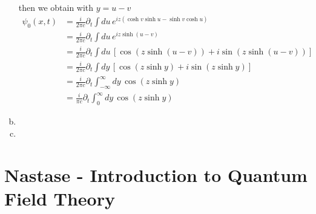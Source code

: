 \documentclass[../main.tex]{subfiles}
\begin{document}
\begin{enumerate}[(a)]
then we obtain with $y=u-v$
\begin{align}
\psi_0(x,t)
&=\frac{i}{2\pi c}\partial_t\int du\,e^{iz(\cosh v\sinh u-\sinh v\cosh u)}\\
&=\frac{i}{2\pi c}\partial_t\int du\,e^{iz\sinh (u-v)}\\
&=\frac{i}{2\pi c}\partial_t\int du\,\left[\cos(z\sinh (u-v))+i\sin(z\sinh (u-v))\right]\\
&=\frac{i}{2\pi c}\partial_t\int dy\,\left[\cos(z\sinh y)+i\sin(z\sinh y)\right]\\
&=\frac{i}{2\pi c}\partial_t\int_{-\infty}^\infty dy\,\cos(z\sinh y)\\
&=\frac{i}{\pi c}\partial_t\int_0^\infty dy\,\cos(z\sinh y)
\end{align}



\item

\item

\end{enumerate}

\section{{\sc Nastase} - Introduction to Quantum Field Theory} 
\end{document}
